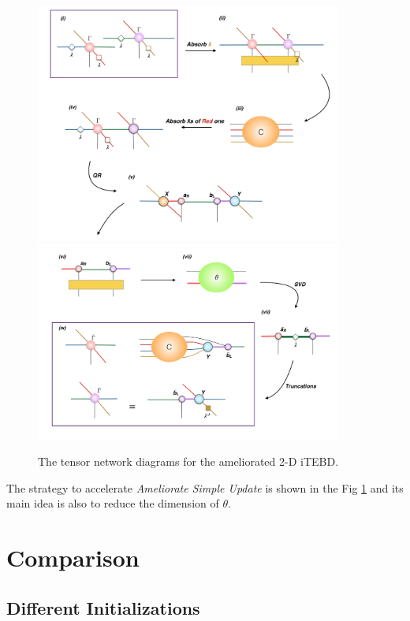 \begin{figure}[ht]
	\centering
	\includegraphics[width=0.90\textwidth]{figures/fig319.png}
	\includegraphics[width=0.90\textwidth]{figures/fig320.png}
	\caption[The tensor network diagrams for the ameliorated 2-D iTEBD with QR decompositiont]{The tensor network diagrams for the ameliorated 2-D iTEBD.}
	\label{fig319}
\end{figure}

The strategy to accelerate \textit{Ameliorate Simple Update} is shown in the Fig \ref{fig319} and its main idea is also to reduce the dimension of $\theta$.

\section{Comparison}
\label{Comparison}
\subsection{Different Initializations}

